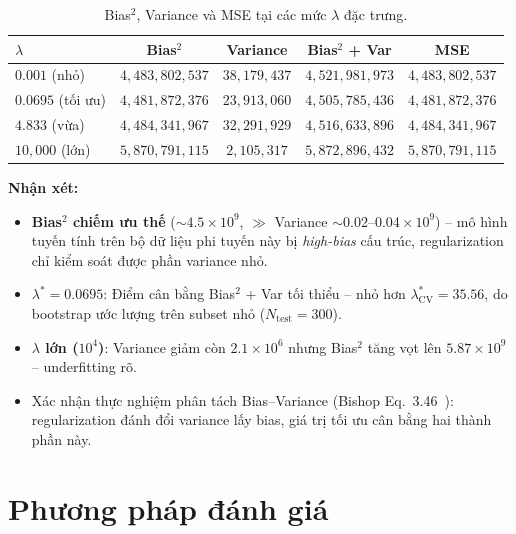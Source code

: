 \documentclass[12pt,a4paper]{article}
\begin{document}
\begin{table}[H]
  \centering
  \caption{Bias$^2$, Variance và MSE tại các mức $\lambda$ đặc trưng.}
  \label{tab:bv_table}
  \begin{tabular}{lcccc}
    \toprule
    $\lambda$ & \textbf{Bias$^2$} & \textbf{Variance}
      & \textbf{Bias$^2$ + Var} & \textbf{MSE} \\
    \midrule
    $0.001$  (nhỏ)     & $4{,}483{,}802{,}537$ & $38{,}179{,}437$ & $4{,}521{,}981{,}973$ & $4{,}483{,}802{,}537$ \\
    $0.0695$ (tối ưu)  & $4{,}481{,}872{,}376$ & $23{,}913{,}060$ & $4{,}505{,}785{,}436$ & $4{,}481{,}872{,}376$ \\
    $4.833$  (vừa)     & $4{,}484{,}341{,}967$ & $32{,}291{,}929$ & $4{,}516{,}633{,}896$ & $4{,}484{,}341{,}967$ \\
    $10{,}000$ (lớn)   & $5{,}870{,}791{,}115$ & $2{,}105{,}317$  & $5{,}872{,}896{,}432$ & $5{,}870{,}791{,}115$ \\
    \bottomrule
  \end{tabular}
\end{table}

\textbf{Nhận xét:}
\begin{itemize}
  \item \textbf{Bias$^2$ chiếm ưu thế} ($\sim 4.5 \times 10^9$,
        $\gg$ Variance $\sim 0.02$--$0.04 \times 10^9$) -- mô hình
        tuyến tính trên bộ dữ liệu phi tuyến này bị \emph{high-bias}
        cấu trúc, regularization chỉ kiểm soát được phần variance nhỏ.
  \item \textbf{$\lambda^* = 0.0695$}: Điểm cân bằng Bias$^2$ + Var
        tối thiểu -- nhỏ hơn $\lambda^*_{\text{CV}} = 35.56$, do bootstrap
        ước lượng trên subset nhỏ ($N_{\text{test}} = 300$).
  \item \textbf{$\lambda$ lớn ($10^4$)}: Variance giảm còn $2.1 \times 10^6$
        nhưng Bias$^2$ tăng vọt lên $5.87 \times 10^9$ -- underfitting rõ.
  \item Xác nhận thực nghiệm phân tách Bias--Variance (Bishop
        Eq.~3.46~\cite{bishop2006}): regularization đánh đổi variance
        lấy bias, giá trị tối ưu cân bằng hai thành phần này.
\end{itemize}

\section{Phương pháp đánh giá}
\label{sec:evaluation_method}
\end{document}
